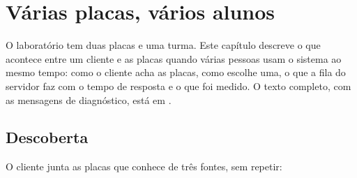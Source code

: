 \chapter{Várias placas, vários alunos}
\label{cap:placas}

O laboratório tem duas placas e uma turma. Este capítulo descreve o que
acontece entre um cliente e as placas quando várias pessoas usam o sistema ao
mesmo tempo: como o cliente acha as placas, como escolhe uma, o que a fila do
servidor faz com o tempo de resposta e o que foi medido. O texto completo, com
as mensagens de diagnóstico, está em .

\section{Descoberta}

O cliente junta as placas que conhece de três fontes, sem repetir:

